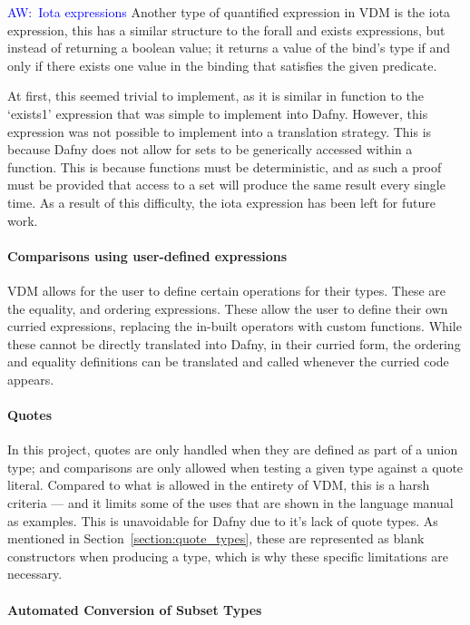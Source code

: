 \documentclass{entcs}
\newcommand{\awcomment}[1]{\ifthenelse { \boolean{showComments} } {\textcolor{blue}{AW:~#1}} { } } %
\begin{document}
\awcomment{Iota expressions}
Another type of quantified expression in VDM is the iota expression, this has a similar structure to the forall and exists expressions, but instead of returning a boolean value; it returns a value of the bind's type if and only if there exists one value in the binding that satisfies the given predicate. 

At first, this seemed trivial to implement, as it is similar in function to the `exists1' expression that was simple to implement into Dafny. However, this expression was not possible to implement into a translation strategy. This is because Dafny does not allow for sets to be generically accessed within a function. This is because functions must be deterministic, and as such a proof must be provided that access to a set will produce the same result every single time. As a result of this difficulty, the iota expression has been left for future work.

\paragraph{Comparisons using user-defined expressions}

VDM allows for the user to define certain operations for their types. These are the equality, and ordering expressions. These allow the user to define their own curried expressions, replacing the in-built operators with custom functions. While these cannot be directly translated into Dafny, in their curried form, the ordering and equality definitions can be translated and called whenever the curried code appears.

\paragraph{Quotes}

In this project, quotes are only handled when they are defined as part of a union type; and comparisons are only allowed when testing a given type against a quote literal. Compared to what is allowed in the entirety of VDM, this is a harsh criteria --- and it limits some of the uses that are shown in the language manual as examples. This is unavoidable for Dafny due to it's lack of quote types. As mentioned in Section~\ref{section:quote_types}, these are represented as blank constructors when producing a type, which is why these specific limitations are necessary.

\paragraph{Automated Conversion of Subset Types}
\end{document}
